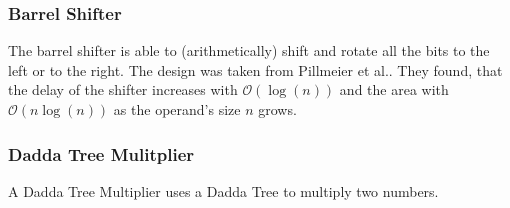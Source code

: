 \documentclass[twoside]{article}
\begin{document}
\subsubsection*{Barrel Shifter}
The barrel shifter is able to (arithmetically) shift and rotate all the bits
to the left or to the right. The design was taken from Pillmeier et
al.\cite{pillmeier02}. They found, that the delay of the shifter increases
with $\mathcal{O}(\log(n))$ and the area with $\mathcal{O}(n\log(n))$ as the
operand's size $n$ grows.

\subsubsection*{Dadda Tree Mulitplier}
A Dadda Tree Multiplier uses a Dadda Tree to multiply two numbers.



\end{document}
